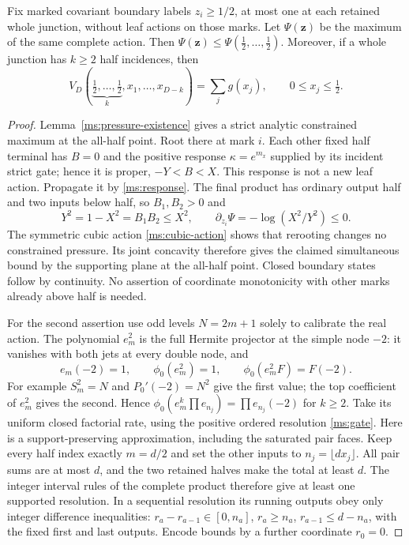 \begin{lemma}\label{ms:half-boundaries}
Fix marked covariant boundary labels $z_i\ge1/2$, at most one at
each retained whole junction, without leaf actions on those marks.
Let $\Psi(\mathbf z)$ be the maximum of the same complete action.
Then $\Psi(\mathbf z)\le\Psi(\tfrac12,\ldots,\tfrac12)$.
Moreover, if a whole junction has $k\ge2$ half incidences, then
\begin{equation}\label{ms:cardinal-action}
 V_D(\underbrace{\tfrac12,\ldots,\tfrac12}_{k},x_1,\ldots,x_{D-k})
       =\sum_j g(x_j),\qquad 0\le x_j\le\tfrac12.
\end{equation}
\end{lemma}
\begin{proof}
Lemma~\ref{ms:pressure-existence} gives a strict analytic constrained
maximum at the all-half point. Root there at mark $i$. Each other
fixed half terminal has $B=0$ and the positive response
$\kappa=e^{m_x}$ supplied by its incident strict gate; hence it
is proper, $-Y<B<X$. This response is not a new leaf action.
Propagate it by \eqref{ms:response}. The final product has ordinary
output half and two inputs below half, so $B_1,B_2>0$ and
\[
 Y^2=1-X^2=B_1B_2\le X^2,
 \qquad \partial_{z_i}\Psi=-\log(X^2/Y^2)\le0.
\]
The symmetric cubic action \eqref{ms:cubic-action} shows that
rerooting changes no constrained pressure. Its joint concavity
therefore gives the claimed simultaneous bound by the supporting
plane at the all-half point. Closed boundary states follow by
continuity. No assertion of coordinate monotonicity with other
marks already above half is needed.

For the second assertion use odd levels $N=2m+1$ solely to
calibrate the real action. The polynomial $e_m^2$ is the full
Hermite projector at the simple node $-2$: it vanishes with both
jets at every double node, and
\[
 e_m(-2)=1,\qquad\phi_0(e_m^2)=1,\qquad
 \phi_0(e_m^2F)=F(-2).
\]
For example $S_m^2=N$ and $P_0'(-2)=N^2$ give the first value;
the top coefficient of $e_m^2$ gives the second. Hence
$\phi_0(e_m^k\prod e_{n_j})=\prod e_{n_j}(-2)$ for $k\ge2$.
Take its uniform closed factorial rate, using the positive ordered
resolution \eqref{ms:gate}. Here is a support-preserving approximation,
including the saturated pair faces. Keep every half index exactly
$m=d/2$ and set the other inputs to $n_j=\lfloor d x_j\rfloor$.
All pair sums are at most $d$, and the two retained halves make
the total at least $d$. The integer interval rules of the complete
product therefore give at least one supported resolution.
In a sequential resolution its running outputs obey only integer
difference inequalities: $r_a-r_{a-1}\in[0,n_a]$,
$r_a\ge n_a$, $r_{a-1}\le d-n_a$, with the fixed first and last
outputs. Encode bounds by a further coordinate $r_0=0$.


\end{proof}
